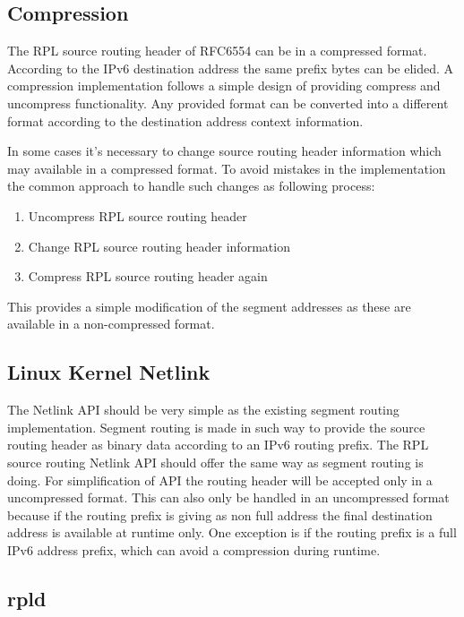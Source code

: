 \documentclass[letterpaper]{article}
\begin{document}
\subsection{Compression}

The RPL source routing header of RFC6554 can be in a compressed format.
According to the IPv6 destination address the same prefix bytes can be elided.
A compression implementation follows a simple design of providing compress and uncompress functionality.
Any provided format can be converted into a different format according to the destination address context information.

In some cases it's necessary to change source routing header information which may available in a compressed format.
To avoid mistakes in the implementation the common approach to handle such changes as following process:

\begin{enumerate}
\item{Uncompress RPL source routing header}
\item{Change RPL source routing header information}
\item{Compress RPL source routing header again}
\end{enumerate}

This provides a simple modification of the segment addresses as these are available in a non-compressed format.

\subsection{Linux Kernel Netlink}

The Netlink API should be very simple as the existing segment routing implementation.
Segment routing is made in such way to provide the source routing header as binary data according to an IPv6 routing prefix.
The RPL source routing Netlink API should offer the same way as segment routing is doing.
For simplification of API the routing header will be accepted only in a uncompressed format.
This can also only be handled in an uncompressed format because if the routing prefix is giving as non full address the final destination address is available at runtime only.
One exception is if the routing prefix is a full IPv6 address prefix, which can avoid a compression during runtime.

\subsection{rpld}
\end{document}
